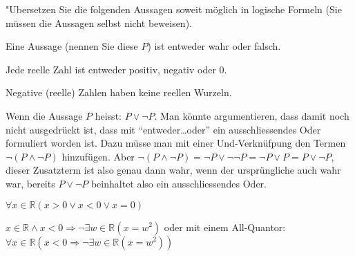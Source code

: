 "Ubersetzen Sie die folgenden Aussagen soweit möglich in
logische Formeln (Sie müssen die Aussagen selbst nicht beweisen).
\begin{teilaufgaben}
\item Eine Aussage (nennen Sie diese $P$) ist entweder wahr oder falsch.
\item Jede reelle Zahl ist entweder positiv, negativ oder $0$.
\item Negative (reelle) Zahlen haben keine reellen Wurzeln.
\end{teilaufgaben}

\begin{loesung}
\begin{teilaufgaben}
\item Wenn die Aussage $P$ heisst: $P\vee\neg P$.
Man könnte argumentieren, dass damit noch nicht ausgedrückt ist,
dass mit ``entweder\dots oder'' ein ausschliessendes Oder formuliert
worden ist. Dazu müsse man mit einer Und-Verknüfpung den Termen
$\neg(P\wedge \neg P)$
hinzufügen. Aber
$\neg(P\wedge \neg P)=\neg P\vee \neg\neg P=\neg P\vee P=P\vee\neg P$,
dieser Zusatzterm ist also genau dann wahr, wenn der ursprüngliche
auch wahr war, bereits $P\vee \neg P$ beinhaltet also ein ausschliessendes
Oder.
\item $\forall x\in\mathbb R(x > 0\vee x<0\vee x=0)$
\item $x\in\mathbb R\wedge x < 0\Rightarrow
\neg\exists w\in\mathbb R(x=w^2)$
oder mit einem All-Quantor: $\forall x\in\mathbb R(x<0\Rightarrow
\neg\exists w\in\mathbb R(x=w^2))$
\qedhere
\end{teilaufgaben}
\end{loesung}

